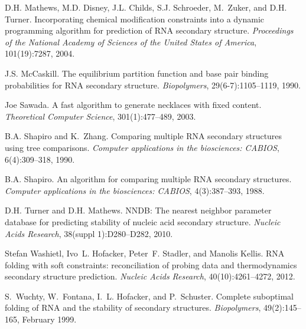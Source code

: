\begin{DoxyDescription}
\item[\label{_CITEREF_mathews:2004}%
\mbox{[}17\mbox{]}]D.\+H. Mathews, M.\+D. Disney, J.\+L. Childs, S.\+J. Schroeder, M.~Zuker, and D.\+H. Turner. Incorporating chemical modification constraints into a dynamic programming algorithm for prediction of R\+NA secondary structure. {\itshape Proceedings of the National Academy of Sciences of the United States of America}, 101(19)\+:7287, 2004.


\item[\label{_CITEREF_mccaskill:1990}%
\mbox{[}18\mbox{]}]J.\+S. Mc\+Caskill. The equilibrium partition function and base pair binding probabilities for R\+NA secondary structure. {\itshape Biopolymers}, 29(6-\/7)\+:1105--1119, 1990.


\item[\label{_CITEREF_sawada:2003}%
\mbox{[}19\mbox{]}]Joe Sawada. A fast algorithm to generate necklaces with fixed content. {\itshape Theoretical Computer Science}, 301(1)\+:477--489, 2003.


\item[\label{_CITEREF_shapiro:1990}%
\mbox{[}20\mbox{]}]B.\+A. Shapiro and K.~Zhang. Comparing multiple R\+NA secondary structures using tree comparisons. {\itshape Computer applications in the biosciences\+: C\+A\+B\+I\+OS}, 6(4)\+:309--318, 1990.


\item[\label{_CITEREF_shapiro:1988}%
\mbox{[}21\mbox{]}]B.\+A. Shapiro. An algorithm for comparing multiple R\+NA secondary structures. {\itshape Computer applications in the biosciences\+: C\+A\+B\+I\+OS}, 4(3)\+:387--393, 1988.


\item[\label{_CITEREF_turner:2010}%
\mbox{[}22\mbox{]}]D.\+H. Turner and D.\+H. Mathews. N\+N\+DB\+: The nearest neighbor parameter database for predicting stability of nucleic acid secondary structure. {\itshape Nucleic Acids Research}, 38(suppl 1)\+:D280--D282, 2010.


\item[\label{_CITEREF_washietl:2012}%
\mbox{[}23\mbox{]}]Stefan Washietl, Ivo~L. Hofacker, Peter~F. Stadler, and Manolis Kellis. R\+NA folding with soft constraints\+: reconciliation of probing data and thermodynamics secondary structure prediction. {\itshape Nucleic Acids Research}, 40(10)\+:4261--4272, 2012.


\item[\label{_CITEREF_wuchty:1999}%
\mbox{[}24\mbox{]}]S.~Wuchty, W.~Fontana, I.~L. Hofacker, and P.~Schuster. Complete suboptimal folding of R\+NA and the stability of secondary structures. {\itshape Biopolymers}, 49(2)\+:145--165, February 1999.



\end{DoxyDescription}
